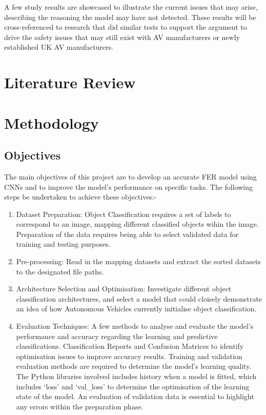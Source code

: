 \documentclass[conference]{IEEEtran}
\begin{document}
	A few study results are showcased to illustrate the current issues that may arise, describing the reasoning the model may have not detected. These results will be cross-referenced to research that did similar tests to support the argument to drive the safety issues that may still exist with AV manufacturers or newly established UK AV manufacturers.

\section{Literature Review}


\section{Methodology}
	\subsection{Objectives}
	The main objectives of this project are to develop an accurate FER model using CNNs and to improve the model's performance on specific tasks. The following steps be undertaken to achieve these objectives:-

	\begin{enumerate}
		\item Dataset Preparation: Object Classification requires a set of labels to correspond to an image, mapping different classified objects wihin the image. Preparation of the data requires being able to select validated data for training and testing purposes.
		\item Pre-processing: Read in the mapping datasets and extract the sorted datasets to the designated file paths. 
		\item Architecture Selection and Optimisation: Investigate different object classification architectures, and select a model that could cloisely demonstrate an idea of how Autonomous Vehicles currently initialise object classification.
		\item Evaluation Techniques: A few methods to analyse and evaluate the model's performance and accuracy regarding the learning and predictive classifications. Classification Reports and Confusion Matrices to identify optimisation issues to improve accuracy results. Training and validation evaluation methods are required to determine the model's learning quality. The Python libraries involved includes history when a model is fitted, which includes `loss' and `val\_loss' to determine the optimisation of the learning state of the model. An evaluation of validation data is essential to highlight any errors within the preparation phase.
	\end{enumerate}
\end{document}
